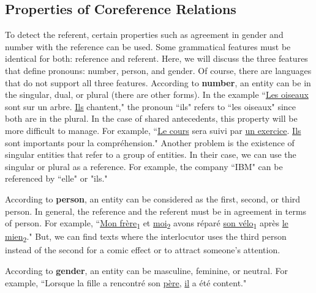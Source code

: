 \documentclass{KBook}
\begin{document}
\subsection{Properties of Coreference Relations}

To detect the referent, certain properties such as agreement in gender and number with the reference can be used. Some grammatical features must be identical for both: reference and referent. Here, we will discuss the three features that define pronouns: number, person, and gender. Of course, there are languages that do not support all three features. According to \textbf{number}, an entity can be in the singular, dual, or plural (there are other forms). In the example ``\underline{Les oiseaux} sont sur un arbre. \underline{Ils} chantent," the pronoun ``ils" refers to ``les oiseaux" since both are in the plural. In the case of shared antecedents, this property will be more difficult to manage. For example, ``\underline{Le cours} sera suivi par \underline{un exercice}. \underline{Ils} sont importants pour la compréhension." Another problem is the existence of singular entities that refer to a group of entities. In their case, we can use the singular or plural as a reference. For example, the company ``IBM" can be referenced by ``elle" or "ils."

According to \textbf{person}, an entity can be considered as the first, second, or third person. In general, the reference and the referent must be in agreement in terms of person. For example, ``\underline{Mon frère}\textsubscript{1} et \underline{moi}\textsubscript{2} avons réparé \underline{son vélo}\textsubscript{1} après \underline{le mien}\textsubscript{2}." But, we can find texts where the interlocutor uses the third person instead of the second for a comic effect or to attract someone's attention.

According to \textbf{gender}, an entity can be masculine, feminine, or neutral. For example, ``Lorsque la fille a rencontré son \underline{père}, \underline{il} a été content."
\end{document}
